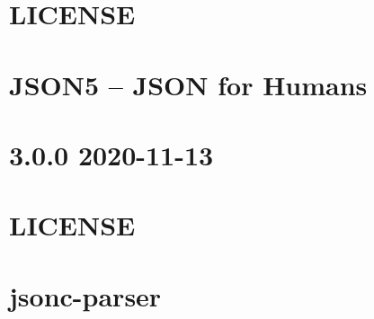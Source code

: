 \documentclass[twoside]{book}
\newcommand{\+}{\discretionary{\mbox{\scriptsize$\hookleftarrow$}}{}{}}
\begin{document}
\chapter{LICENSE}
\label{md__c___users_vaishnavi_jadhav__desktop__developer_code_mean_stack_example_client_node_modules_json5__l_i_c_e_n_s_e}

\chapter{JSON5 – JSON for Humans}
\label{md__c___users_vaishnavi_jadhav__desktop__developer_code_mean_stack_example_client_node_modules_json5__r_e_a_d_m_e}

\chapter{3.0.0 2020-\/11-\/13}
\label{md__c___users_vaishnavi_jadhav__desktop__developer_code_mean_stack_example_client_node_modules_jsonc_parser__c_h_a_n_g_e_l_o_g}

\chapter{LICENSE}
\label{md__c___users_vaishnavi_jadhav__desktop__developer_code_mean_stack_example_client_node_modules_jsonc_parser__l_i_c_e_n_s_e}

\chapter{jsonc-\/parser}
\label{md__c___users_vaishnavi_jadhav__desktop__developer_code_mean_stack_example_client_node_modules_jsonc_parser__r_e_a_d_m_e}

\end{document}
